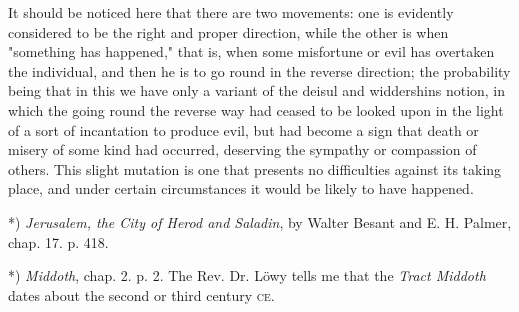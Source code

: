 \documentclass[a4paper, 11pt, oneside, polutonikogreek, english]{article}
\begin{document}
It should be noticed here that there are two movements: one is evidently considered to be the right and proper direction, while the other is when "something has happened," that is, when some misfortune or evil has overtaken the individual, and then he is to go round in the reverse direction; the probability being that in this we have only a variant of the deisul and widdershins notion, in which the going round the reverse way had ceased to be looked upon in the light of a sort of incantation to produce evil, but had become a sign that death or misery of some kind had occurred, deserving the sympathy or compassion of others. This slight mutation is one that presents no difficulties against its taking place, and under certain circumstances it would be likely to have happened.

*) \emph{Jerusalem, the City of Herod and Saladin}, by Walter Besant and E. H. Palmer, chap. 17. p. 418.

*) \emph{Middoth}, chap. 2. p. 2. The Rev. Dr. Löwy tells me that the \emph{Tract Middoth} dates about the second or third century \textsc{ce}.
\end{document}
